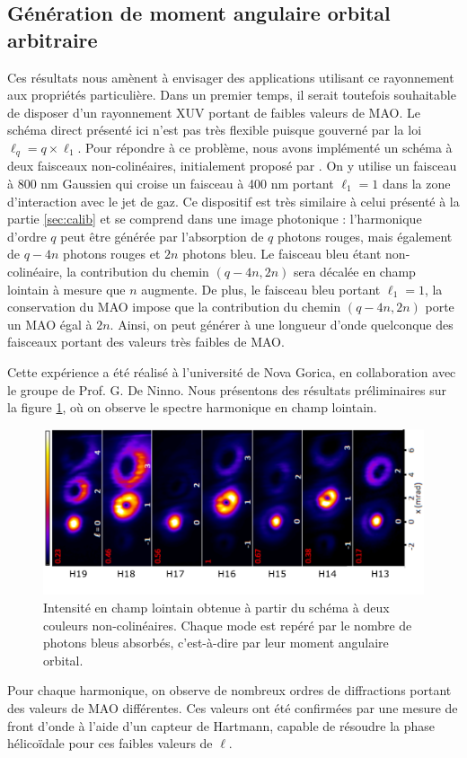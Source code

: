 \subsection{Génération de moment angulaire orbital arbitraire}
Ces résultats nous amènent à envisager des applications utilisant ce rayonnement aux propriétés particulière. Dans un premier temps, il serait toutefois souhaitable de disposer d'un rayonnement XUV portant de faibles valeurs de MAO. Le schéma direct présenté ici n'est pas très flexible puisque gouverné par la loi $\ell_q=q\times\ell_1$. Pour répondre à ce problème, nous avons implémenté un schéma à deux faisceaux non-colinéaires, initialement proposé par . On y utilise un faisceau à 800 nm Gaussien qui croise un faisceau à 400 nm portant $\ell_1 = 1$ dans la zone d'interaction avec le jet de gaz. Ce dispositif est très similaire à celui présenté à la partie \ref{sec:calib} et se comprend dans une image photonique : l'harmonique d'ordre $q$ peut être générée par l'absorption de $q$ photons rouges, mais également de $q-4n$ photons rouges et $2n$ photons bleu. Le faisceau bleu étant non-colinéaire, la contribution du chemin $(q-4n,2n)$ sera décalée en champ lointain à mesure que $n$ augmente. De plus, le faisceau bleu portant $\ell_1=1$, la conservation du MAO impose que la contribution du chemin $(q-4n,2n)$ porte un MAO égal à $2n$. Ainsi, on peut générer à une longueur d'onde quelconque des faisceaux portant des valeurs très faibles de MAO.

Cette expérience a été réalisé à l'université de Nova Gorica, en collaboration avec le groupe de Prof. G. De Ninno. Nous présentons des résultats préliminaires sur la figure \ref{fig:gauthier}, où on observe le spectre harmonique en champ lointain. 

\begin{figure}[!ht]
\centering
\includegraphics[width=0.8\columnwidth]{Figures/Conclusion/gauthier.pdf}%
\caption{Intensité en champ lointain obtenue à partir du schéma à deux couleurs non-colinéaires. Chaque mode est repéré par le nombre de photons bleus absorbés, c'est-à-dire par leur moment angulaire orbital.}
\label{fig:gauthier}
\end{figure}
Pour chaque harmonique, on observe de nombreux ordres de diffractions portant des valeurs de MAO différentes. Ces valeurs ont été confirmées par une mesure de front d'onde à l'aide d'un capteur de Hartmann, capable de résoudre la phase hélicoïdale pour ces faibles valeurs de $\ell$.

